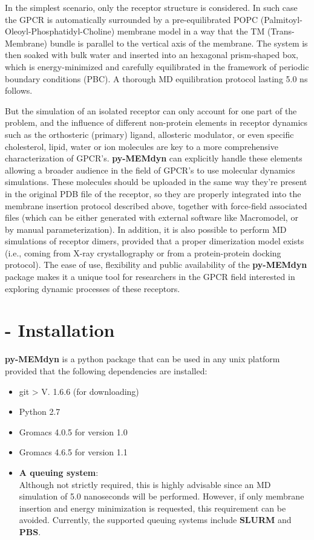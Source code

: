 \documentclass[10pt, oneside, pdftex]{article}
\begin{document}
In   the   simplest  scenario,   only   the   receptor  structure   is
considered. In  such case  the GPCR is  automatically surrounded  by a
pre-equilibrated POPC (Palmitoyl-Oleoyl-Phosphatidyl-Choline) membrane
model in a way that the  TM (Trans-Membrane) bundle is parallel to the
vertical axis  of the  membrane. The system  is then soaked  with bulk
water  and  inserted into  an  hexagonal  prism-shaped  box, which  is
energy-minimized  and  carefully  equilibrated  in  the  framework  of
periodic  boundary  conditions  (PBC).  A  thorough  MD  equilibration
protocol lasting 5.0 ns follows.

But the  simulation of an isolated  receptor can only  account for one
part  of  the problem,  and  the  influence  of different  non-protein
elements  in  receptor  dynamics  such as  the  orthosteric  (primary)
ligand,  allosteric modulator,  or even  specific  cholesterol, lipid,
water   or  ion   molecules   are  key   to   a  more   comprehensive
characterization of GPCR's.   \textbf{py-MEMdyn} can explicitly handle
these elements allowing  a broader audience in the  field of GPCR's to
use molecular dynamics simulations. These molecules should be uploaded
in  the same  way they're  present  in the  original PDB  file of  the
receptor, so they are  properly integrated into the membrane insertion
protocol described  above, together with  force-field associated files
(which can be either generated with external software like Macromodel,
or by manual  parameterization).  In addition, it is  also possible to
perform  MD simulations  of receptor  dimers, provided  that  a proper
dimerization model exists (i.e.,  coming from X-ray crystallography or
from  a   protein-protein  docking   protocol).   The  ease   of  use,
flexibility and public  availability of the \textbf{py-MEMdyn} package
makes it a unique tool for researchers in the GPCR field interested in
exploring dynamic processes of these receptors.

\section*{ - Installation}
\textbf{py-MEMdyn} is a python package that can be used in  any unix
platform provided that the following dependencies are installed:
\begin{itemize}\itemsep0em
\item {git > V. 1.6.6 (for downloading)}
\item {Python 2.7}
\item {Gromacs 4.0.5 for version 1.0}
\item {Gromacs 4.6.5 for version 1.1}
\item {\textbf{A  queuing system}:\\  Although not  strictly required,
this is  highly advisable  since an MD  simulation of  5.0 nanoseconds
will be  performed.  However,  if only  membrane insertion  and energy
minimization is requested, this requirement can be avoided. Currently,
the   supported    queuing   systems   include    \textbf{SLURM}   and
\textbf{PBS}.}
\end{itemize}
\end{document}
